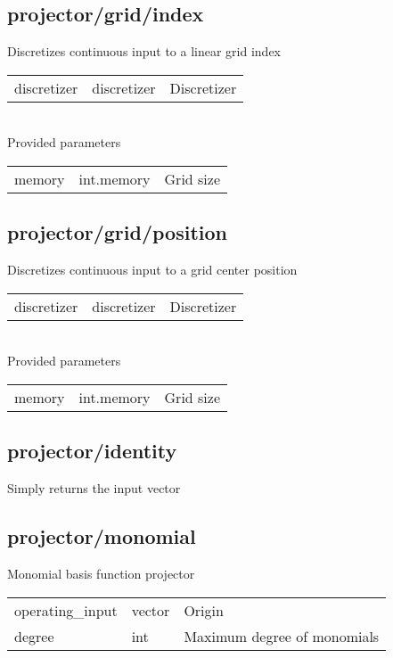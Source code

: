 \subsection{projector/grid/index}
\noindent Discretizes continuous input to a linear grid index\\

\noindent\begin{tabular}{@{}lll@{}}
discretizer&discretizer&Discretizer\\
\end{tabular}
\\

\noindent Provided parameters\\

\noindent\begin{tabular}{@{}lll@{}}
memory&int.memory&Grid size\\
\end{tabular}
\subsection{projector/grid/position}
\noindent Discretizes continuous input to a grid center position\\

\noindent\begin{tabular}{@{}lll@{}}
discretizer&discretizer&Discretizer\\
\end{tabular}
\\

\noindent Provided parameters\\

\noindent\begin{tabular}{@{}lll@{}}
memory&int.memory&Grid size\\
\end{tabular}
\subsection{projector/identity}
\noindent Simply returns the input vector\\

\subsection{projector/monomial}
\noindent Monomial basis function projector\\

\noindent\begin{tabular}{@{}lll@{}}
operating\_input&vector&Origin\\
degree&int&Maximum degree of monomials\\
\end{tabular}
\\

